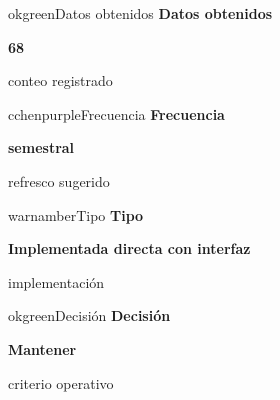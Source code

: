 \documentclass[9pt,a4paper]{extarticle}
\begin{document}
\vspace{0.04cm}
\begin{minipage}{0.24\textwidth}
\begin{metricbox}{okgreen}{Datos obtenidos}
{\large\bfseries Datos obtenidos}\par
{\Large\bfseries 68}\par
{\normalsize conteo registrado}
\end{metricbox}
\end{minipage}\hfill
\begin{minipage}{0.24\textwidth}
\begin{metricbox}{cchenpurple}{Frecuencia}
{\large\bfseries Frecuencia}\par
{\large\bfseries semestral}\par
{\normalsize refresco sugerido}
\end{metricbox}
\end{minipage}\hfill
\begin{minipage}{0.24\textwidth}
\begin{metricbox}{warnamber}{Tipo}
{\large\bfseries Tipo}\par
{\normalsize\bfseries Implementada directa con interfaz}\par
{\normalsize implementación}
\end{metricbox}
\end{minipage}\hfill
\begin{minipage}{0.24\textwidth}
\begin{metricbox}{okgreen}{Decisión}
{\large\bfseries Decisión}\par
{\normalsize\bfseries Mantener}\par
{\normalsize criterio operativo}
\end{metricbox}
\end{minipage}
\end{document}
